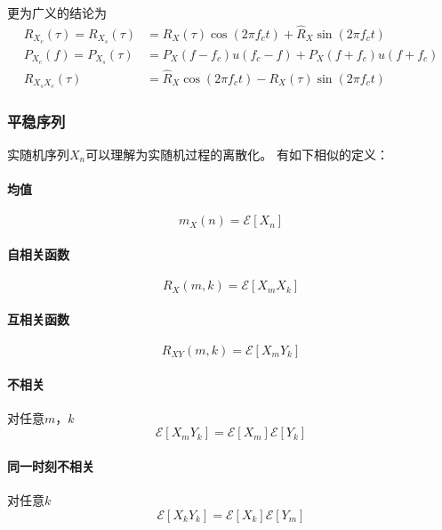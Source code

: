     更为广义的结论为
    \begin{align}
        R_{X_c}(\tau)=R_{X_s}(\tau)&=R_X(\tau)\cos(2\pi f_ct)+\hat{R}_X\sin(2\pi f_ct)\\
        P_{X_c}(f)=P_{X_s}(\tau)&=P_X(f-f_c)u(f_c-f)+P_X(f+f_c)u(f+f_c)\\
        R_{X_sX_c}(\tau)&=\hat{R}_X\cos(2\pi f_ct)-R_X(\tau)\sin(2\pi f_ct)
    \end{align}

   
    \subsubsection{平稳序列}
    实随机序列$X_n$可以理解为实随机过程的离散化。
    有如下相似的定义：

    \paragraph{均值}
    \begin{equation}
        m_X(n)=\mathscr{E}[X_n]
    \end{equation}
    \paragraph{自相关函数}
    \begin{equation}
        R_X(m,k)=\mathscr{E}[X_mX_k]
    \end{equation}
    \paragraph{互相关函数}
    \begin{equation}
        R_{XY}(m,k)=\mathscr{E}[X_mY_k]
    \end{equation}
    \paragraph{不相关}对任意$m$，$k$\vspace{-0.5ex}
    \begin{equation}
        \mathscr{E}[X_mY_k]=\mathscr{E}[X_m]\mathscr{E}[Y_k]
    \end{equation}
    \paragraph{同一时刻不相关}对任意$k$\vspace{-0.5ex}
    \begin{equation}
        \mathscr{E}[X_kY_k]=\mathscr{E}[X_k]\mathscr{E}[Y_m]
    \end{equation}
